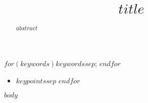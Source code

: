 \documentclass[$paper$,$reftype$]{$document-class$}
\title{$title$}
\begin{document}
\begin{frontmatter}
\maketitle
\begin{abstract}
$abstract$
\end{abstract}

\begin{keywords}
$for(keywords)$$keywords$$sep$; $endfor$
\end{keywords}
\end{frontmatter}

\begin{keypoints*}
\begin{itemize}
$for(keypoints)$\item{$keypoints$}$sep$
$endfor$
\end{itemize}
\end{keypoints*}

$body$

\end{document}
